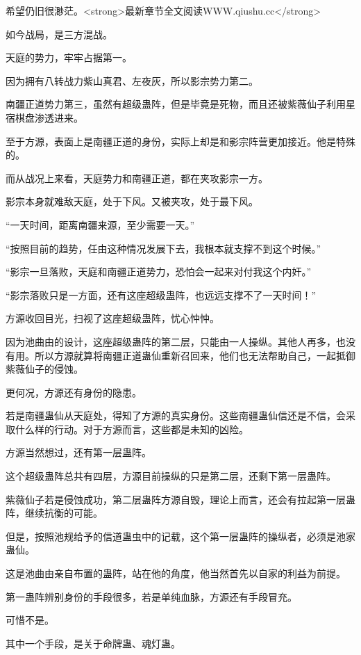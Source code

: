 
\begin{this_body}

希望仍旧很渺茫。<strong>最新章节全文阅读WWW.qiushu.cc</strong>

如今战局，是三方混战。

天庭的势力，牢牢占据第一。

因为拥有八转战力紫山真君、左夜灰，所以影宗势力第二。

南疆正道势力第三，虽然有超级蛊阵，但是毕竟是死物，而且还被紫薇仙子利用星宿棋盘渗透进来。

至于方源，表面上是南疆正道的身份，实际上却是和影宗阵营更加接近。他是特殊的。

而从战况上来看，天庭势力和南疆正道，都在夹攻影宗一方。

影宗本身就难敌天庭，处于下风。又被夹攻，处于最下风。

“一天时间，距离南疆来源，至少需要一天。”

“按照目前的趋势，任由这种情况发展下去，我根本就支撑不到这个时候。”

“影宗一旦落败，天庭和南疆正道势力，恐怕会一起来对付我这个内奸。”

“影宗落败只是一方面，还有这座超级蛊阵，也远远支撑不了一天时间！”

方源收回目光，扫视了这座超级蛊阵，忧心忡忡。

因为池曲由的设计，这座超级蛊阵的第二层，只能由一人操纵。其他人再多，也没有用。所以方源就算将南疆正道蛊仙重新召回来，他们也无法帮助自己，一起抵御紫薇仙子的侵蚀。

更何况，方源还有身份的隐患。

若是南疆蛊仙从天庭处，得知了方源的真实身份。这些南疆蛊仙信还是不信，会采取什么样的行动。对于方源而言，这些都是未知的凶险。

方源当然想过，还有第一层蛊阵。

这个超级蛊阵总共有四层，方源目前操纵的只是第二层，还剩下第一层蛊阵。

紫薇仙子若是侵蚀成功，第二层蛊阵方源自毁，理论上而言，还会有拉起第一层蛊阵，继续抗衡的可能。

但是，按照池规给予的信道蛊虫中的记载，这个第一层蛊阵的操纵者，必须是池家蛊仙。

这是池曲由亲自布置的蛊阵，站在他的角度，他当然首先以自家的利益为前提。

第一蛊阵辨别身份的手段很多，若是单纯血脉，方源还有手段冒充。

可惜不是。

其中一个手段，是关于命牌蛊、魂灯蛊。


\end{this_body}
